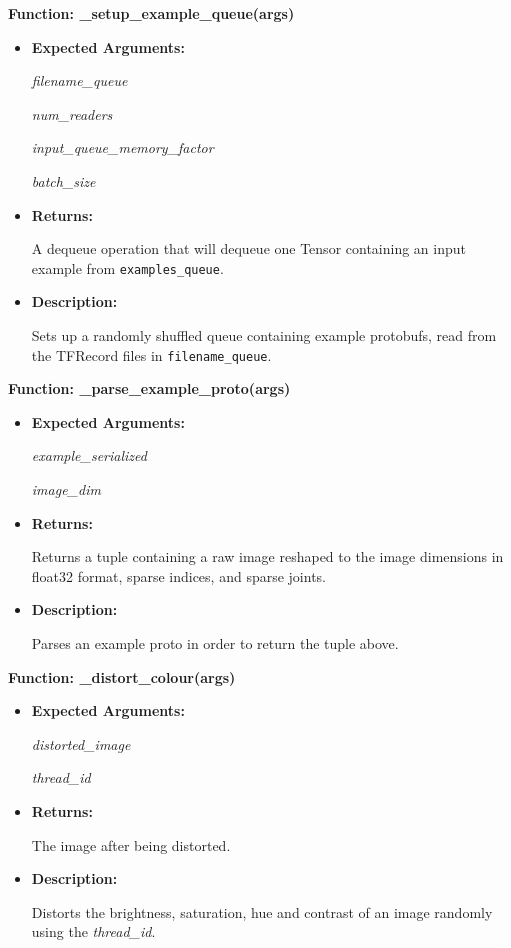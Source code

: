 \documentclass{scrreprt}
\begin{document}
\textbf{Function: \_setup\_example\_queue(args)}
\begin{itemize}
    \item \textbf{Expected Arguments:}

            \quad\textit{filename\_queue}

            \quad\textit{num\_readers}

            \quad\textit{input\_queue\_memory\_factor}

            \quad\textit{batch\_size}

    \item \textbf{Returns:}

            A dequeue operation that will dequeue one Tensor containing  an
                input example from \verb|examples_queue|.

    \item \textbf{Description:}

            Sets up a randomly shuffled queue containing example protobufs,
                read from the TFRecord files in \verb|filename_queue|.

\end{itemize}

\textbf{Function: \_parse\_example\_proto(args)}
\begin{itemize}
    \item \textbf{Expected Arguments:}

            \quad\textit{example\_serialized}

            \quad\textit{image\_dim}

    \item \textbf{Returns:}

            Returns a tuple containing a raw image reshaped to the image dimensions in float32 format, sparse indices, and sparse joints.

    \item \textbf{Description:}

            Parses an example proto in order to return the tuple above.

\end{itemize}

\textbf{Function: \_distort\_colour(args)}
\begin{itemize}
    \item \textbf{Expected Arguments:}

            \quad\textit{distorted\_image}

            \quad\textit{thread\_id}

    \item \textbf{Returns:}

            The image after being distorted.

    \item \textbf{Description:}

            Distorts the brightness, saturation, hue and contrast of an image randomly using the \textit{thread\_id}. 
\end{itemize}
\end{document}
